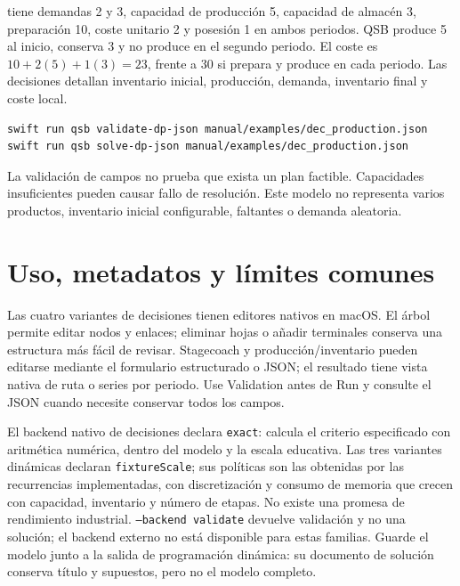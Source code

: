  tiene demandas 2 y 3, capacidad de producción 5,
capacidad de almacén 3, preparación 10, coste unitario 2 y posesión 1 en ambos
periodos. QSB produce 5 al inicio, conserva 3 y no produce en el segundo
periodo. El coste es $10+2(5)+1(3)=23$, frente a 30 si prepara y produce en
cada periodo. Las decisiones detallan inventario inicial, producción,
demanda, inventario final y coste local.
\begin{lstlisting}
swift run qsb validate-dp-json manual/examples/dec_production.json
swift run qsb solve-dp-json manual/examples/dec_production.json
\end{lstlisting}
La validación de campos no prueba que exista un plan factible. Capacidades
insuficientes pueden causar fallo de resolución. Este modelo no representa
varios productos, inventario inicial configurable, faltantes o demanda aleatoria.

\section{Uso, metadatos y límites comunes}
Las cuatro variantes de decisiones tienen editores nativos en macOS. El árbol
permite editar nodos y enlaces; eliminar hojas o añadir terminales conserva una
estructura más fácil de revisar. Stagecoach y producción/inventario pueden
editarse mediante el formulario estructurado o JSON; el resultado tiene vista
nativa de ruta o series por periodo. Use Validation antes de Run y consulte el
JSON cuando necesite conservar todos los campos.

El backend nativo de decisiones declara \texttt{exact}: calcula el criterio
especificado con aritmética numérica, dentro del modelo y la escala educativa.
Las tres variantes dinámicas declaran \texttt{fixtureScale}; sus políticas son
las obtenidas por las recurrencias implementadas, con discretización y consumo
de memoria que crecen con capacidad, inventario y número de etapas. No existe
una promesa de rendimiento industrial. \texttt{--backend validate} devuelve
validación y no una solución; el backend externo no está disponible para estas
familias. Guarde el modelo junto a la salida de programación dinámica: su
documento de solución conserva título y supuestos, pero no el modelo completo.

